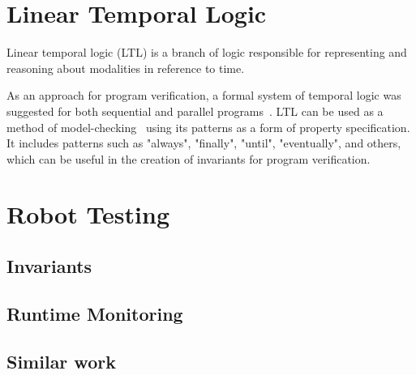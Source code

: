 \section{Linear Temporal Logic}
\label{sec:ltl}

Linear temporal logic (LTL) is a branch of logic responsible for representing and reasoning about modalities in reference to time. 

As an approach for program verification, a formal system of temporal logic was suggested for both sequential and parallel programs~\cite{pnueli1977temporal}. LTL can be used as a method of model-checking~\cite{dwyer1998property} using its patterns as a form of property specification. It includes patterns such as "always", "finally", "until", "eventually", and others, which can be useful in the creation of invariants for program verification.

\section{Robot Testing}
\label{sec:robottesting}

\subsection{Invariants}

\subsection{Runtime Monitoring}

\subsection{Similar work}
